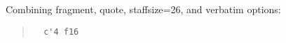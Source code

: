 \documentclass[a4paper, 12pt]{article}
\begin{document}
Combining fragment, quote, staffsize=26, and verbatim options:

\begin{quote}
\noindent
\begin{verbatim}
  c'4 f16
\end{verbatim}
{%
\parindent 0pt
\noindent
\ifx\preLilyPondExample \undefined
\else
  \expandafter\preLilyPondExample
\fi
\def\lilypondbook{}%

\ifx\postLilyPondExample \undefined
\else
  \expandafter\postLilyPondExample
\fi
}
\end{quote}
\end{document}
